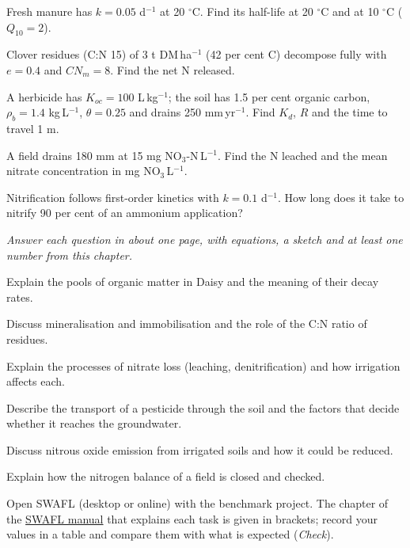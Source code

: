 \begin{exlist}
\item Fresh manure has $k=0.05$ d$^{-1}$ at 20 $^\circ$C. Find its half-life at 20 $^\circ$C and at 10 $^\circ$C ($Q_{10}=2$).
\item Clover residues (C:N 15) of 3 t DM\,ha$^{-1}$ (42 per cent C) decompose fully with $e=0.4$ and $CN_m=8$. Find the net N released.
\item A herbicide has $K_{oc}=100$ L\,kg$^{-1}$; the soil has 1.5 per cent organic carbon, $\rho_b=1.4$ kg\,L$^{-1}$, $\theta=0.25$ and drains 250 mm\,yr$^{-1}$. Find $K_d$, $R$ and the time to travel 1 m.
\item A field drains 180 mm at 15 mg NO$_3$-N\,L$^{-1}$. Find the N leached and the mean nitrate concentration in mg NO$_3$\,L$^{-1}$.
\item Nitrification follows first-order kinetics with $k=0.1$ d$^{-1}$. How long does it take to nitrify 90 per cent of an ammonium application?
\end{exlist}
{\small\itshape Answer each question in about one page, with equations, a sketch and at least one number from this chapter.}\par\vspace{3pt}
\begin{exlist}
\item Explain the pools of organic matter in Daisy and the meaning of their decay rates.
\item Discuss mineralisation and immobilisation and the role of the C:N ratio of residues.
\item Explain the processes of nitrate loss (leaching, denitrification) and how irrigation affects each.
\item Describe the transport of a pesticide through the soil and the factors that decide whether it reaches the groundwater.
\item Discuss nitrous oxide emission from irrigated soils and how it could be reduced.
\item Explain how the nitrogen balance of a field is closed and checked.
\end{exlist}
{\small Open SWAFL (desktop or online) with the benchmark project. The chapter of the \href{https://github.com/halilunaziru73-creator/Coupled-Water-Fluxes-Pore-Scale-Dynamics-Precision-Irrigation-Mulching-Feedback-Loops/raw/main/Software/v1.1.0/SWAFL_Desktop/docs/manual_v1.1.0/SWAFL_Manual_v1.1.0.pdf}{SWAFL manual} that explains each task is given in brackets; record your values in a table and compare them with what is expected (\emph{Check}).}\par\vspace{3pt}
